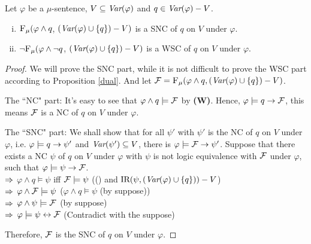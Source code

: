 \documentclass[runningheads]{llncs}
\begin{document}
\begin{theorem}\label{thm:SNC:WSC:forget}
 Let $\varphi$ be a $\mu$-sentence, $V\subseteq\textit{Var}(\varphi)$ and $q\in\textit{Var}(\varphi)- V$.
 \begin{enumerate}[(i)]
   \item ${\textsc{F}_{\textsc{$\mu$}}}(\varphi \land q$, $(\textit{Var}(\varphi) \cup \{q\}) - V)$
   is a SNC of $q$ on $V$ under $\varphi$.
   \item  $\neg{\textsc{F}_{\textsc{$\mu$}}} (\varphi \land \neg q$, $(\textit{Var}(\varphi) \cup \{q\}) - V)$
   is a WSC of $q$ on $V$ under $\varphi$.
 \end{enumerate}
 \end{theorem}
 \begin{proof}
  We will prove the SNC part, while it is not difficult to prove the WSC part according to Proposition \ref{dual}. And let ${\cal F}={\textsc{F}_{\textsc{$\mu$}}}(\varphi \wedge q, (\textit{Var}(\varphi) \cup \{q\})- V)$.

    The ``NC" part: It's easy to see that $\varphi \wedge q \models {\cal F}$ by {\bfseries (W)}. Hence, $\varphi\models q \rightarrow {\cal F}$, this means
  ${\cal F}$ is a NC of $q$ on $V$ under $\varphi$.

  The ``SNC" part: We shall show that for all $\psi'$ with $\psi'$ is the NC of $q$ on $V$ under $\varphi$, i.e. $\varphi \models q \rightarrow \psi'$ and $\textit{Var}(\psi') \subseteq V$, there is $\varphi \models {\cal F} \rightarrow \psi'$. Suppose that there exists a NC $\psi$ of $q$ on $V$ under $\varphi$ with $\psi$ is not logic equivalence with ${\cal F}$ under $\varphi$, such that $\varphi \models \psi \rightarrow {\cal F}$.\\
  $\Rightarrow$ $\varphi \wedge q \models \psi$ iff ${\cal F} \models \psi$ \hfill ((\PP) and $\textrm{IR}(\psi, (\textit{Var}(\varphi)\cup \{q\})) -V$)\\
  $\Rightarrow$ $\varphi \wedge {\cal F} \models \psi$  \hfill ($\varphi \wedge q \models \psi$ (by suppose))\\
  $\Rightarrow$ $\varphi \wedge \psi \models {\cal F}$  \hfill (by suppose)\\
  $\Rightarrow$ $\varphi \models \psi \leftrightarrow {\cal F}$  \hfill (Contradict with the suppose)

  Therefore, ${\cal F}$ is the SNC of $q$ on $V$ under $\varphi$.
 \end{proof}
%
%
\end{document}
